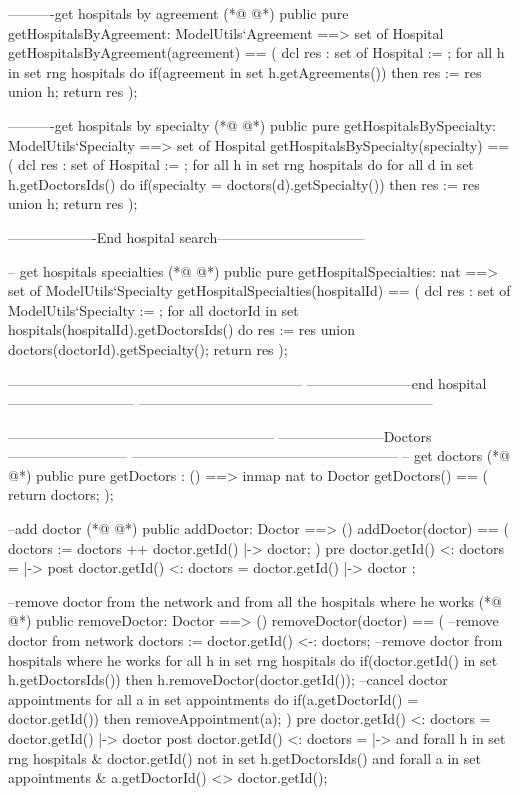 \begin{vdmpp}[breaklines=true]
  ----------get hospitals by agreement
(*@
\label{getHospitalsByAgreement:125}
@*)
  public pure getHospitalsByAgreement: ModelUtils`Agreement ==> set of Hospital
   getHospitalsByAgreement(agreement) == (
    dcl res : set of Hospital := {};
    for all h in set rng hospitals do
      if(agreement in set h.getAgreements()) then
       res := res union {h};
    return res
   );
   
  ----------get hospitals by specialty
(*@
\label{getHospitalsBySpecialty:135}
@*)
  public pure getHospitalsBySpecialty: ModelUtils`Specialty ==> set of Hospital
   getHospitalsBySpecialty(specialty) == (
    dcl res : set of Hospital := {};
    for all h in set rng hospitals do
     for all d in set h.getDoctorsIds() do
      if(specialty = doctors(d).getSpecialty()) then
       res := res union {h};
    return res
   );
   
  -------------------End hospital search--------------------------------
    
  -- get hospitals specialties
(*@
\label{getHospitalSpecialties:148}
@*)
  public pure getHospitalSpecialties: nat ==> set of ModelUtils`Specialty
   getHospitalSpecialties(hospitalId) == (
    dcl res : set of ModelUtils`Specialty := {};
     for all doctorId in set hospitals(hospitalId).getDoctorsIds() do
       res := res union {doctors(doctorId).getSpecialty()};
    return res
   );
   
    
  ---------------------------------------------------------------
  -----------------------end hospital ---------------------------
  ---------------------------------------------------------------
  
  
  ---------------------------------------------------------
  -----------------------Doctors --------------------------
  ---------------------------------------------------------
  -- get doctors
(*@
\label{getDoctors:166}
@*)
  public pure getDoctors : () ==> inmap nat to Doctor
  getDoctors() == (
   return doctors;
  );
    
  --add doctor
(*@
\label{addDoctor:172}
@*)
  public addDoctor: Doctor ==> ()
  addDoctor(doctor) == (
   doctors := doctors ++  { doctor.getId() |-> doctor};
  )
  pre {doctor.getId() } <: doctors = { |-> }  
  post {doctor.getId() } <: doctors = { doctor.getId() |-> doctor };
  
  --remove doctor from the network and from all the hospitals where he works
(*@
\label{removeDoctor:180}
@*)
  public removeDoctor: Doctor ==> ()
  removeDoctor(doctor) == (
   --remove doctor from network
   doctors := {doctor.getId()} <-: doctors;
   --remove doctor from hospitals where he works
   for all h in set rng hospitals do 
    if(doctor.getId() in set h.getDoctorsIds()) then
     h.removeDoctor(doctor.getId());
   --cancel doctor appointments
   for all a in set appointments do 
    if(a.getDoctorId() = doctor.getId()) then
     removeAppointment(a);
  )
   pre {doctor.getId()} <: doctors = { doctor.getId() |-> doctor } 
  post {doctor.getId()} <: doctors = { |-> } and 
     forall h in set rng hospitals & doctor.getId() not in set h.getDoctorsIds() and 
     forall a in set appointments & a.getDoctorId() <> doctor.getId();
  

\end{vdmpp}
